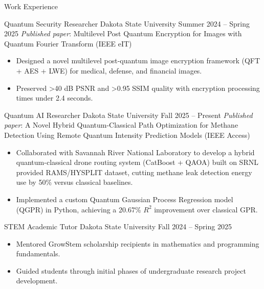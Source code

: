 \documentclass[]{mcdowellcv}
\begin{document}
\begin{cvsection}
    {Work Experience}
    \begin{cvsubsection}
        {Quantum Security Researcher}
        {Dakota State University}
        {Summer 2024 -- Spring 2025}
        \textit{Published paper}: Multilevel Post Quantum Encryption for
        Images with Quantum Fourier Transform (IEEE eIT)
        \begin{itemize}
            \item{
                    Designed a novel multilevel post-quantum
                    image encryption framework (QFT + AES + LWE) for
                    medical, defense, and financial images.
                }
            \item{
                    Preserved >40 dB PSNR and >0.95 SSIM quality with
                    encryption processing times under 2.4 seconds.
                }
        \end{itemize}
    \end{cvsubsection}
    \begin{cvsubsection}
        {Quantum AI Researcher}
        {Dakota State University}
        {Fall 2025 -- Present}
        \textit{Published paper}: A Novel Hybrid Quantum-Classical Path
        Optimization for Methane Detection Using Remote Quantum
        Intensity Prediction Models (IEEE Access)
        \begin{itemize}
            \item{
                    Collaborated with Savannah River National
                    Laboratory to develop a hybrid quantum-classical drone
                    routing system (CatBoost + QAOA) built on
                    SRNL provided RAMS/HYSPLIT dataset, cutting
                    methane leak detection energy use by 50\% versus
                    classical baselines.
                }
            \item{
                    Implemented a custom Quantum Gaussian
                    Process Regression model (QGPR) in Python, achieving a
                    20.67\% $R^2$ improvement over classical GPR.
                }
        \end{itemize}
    \end{cvsubsection}
    \begin{cvsubsection}
        {STEM Academic Tutor}
        {Dakota State University}
        {Fall 2024 -- Spring 2025}
        \begin{itemize}
            \item {
                    Mentored GrowStem scholarship recipients in mathematics and
                    programming fundamentals.
                }
            \item {
                    Guided students through initial phases of undergraduate
                    research project development.
                }
        \end{itemize}
    \end{cvsubsection}
\end{cvsection}
\end{document}
